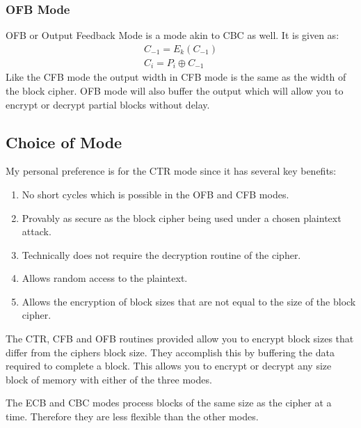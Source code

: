 \documentclass[a4paper]{book}
\begin{document}
\subsubsection{OFB Mode}
OFB or Output Feedback Mode is a mode akin to CBC as well.  It is given as:
\begin{eqnarray}
C_{-1} = E_k(C_{-1}) \nonumber \\
C_i = P_i \oplus C_{-1}
\end{eqnarray}
Like the CFB mode the output width in CFB mode is the same as the width of the block cipher.  OFB mode will also
buffer the output which will allow you to encrypt or decrypt partial blocks without delay.

\subsection{Choice of Mode}
My personal preference is for the CTR mode since it has several key benefits:
\begin{enumerate}
   \item No short cycles which is possible in the OFB and CFB modes.
   \item Provably as secure as the block cipher being used under a chosen plaintext attack.
   \item Technically does not require the decryption routine of the cipher.
   \item Allows random access to the plaintext.
   \item Allows the encryption of block sizes that are not equal to the size of the block cipher.
\end{enumerate}
The CTR, CFB and OFB routines provided allow you to encrypt block sizes that differ from the ciphers block size.  They 
accomplish this by buffering the data required to complete a block.  This allows you to encrypt or decrypt any size 
block of memory with either of the three modes.

The ECB and CBC modes process blocks of the same size as the cipher at a time.  Therefore they are less flexible than the
other modes.
\end{document}
